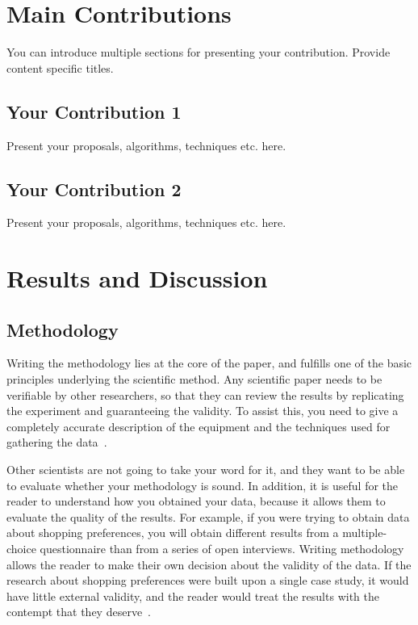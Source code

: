 \documentclass{winslabreport}
\begin{document}
\section{Main Contributions}

You can introduce multiple sections for presenting your contribution. Provide content specific titles.

\subsection{Your Contribution 1}

Present your proposals, algorithms, techniques etc. here.

\subsection{Your Contribution 2}

Present your proposals, algorithms, techniques etc. here.


\section{Results and Discussion}

\subsection{Methodology}
Writing the methodology lies at the core of the paper, and fulfills one of the basic principles underlying the scientific method. Any scientific paper needs to be verifiable by other researchers, so that they can review the results by replicating the experiment and guaranteeing the validity. To assist this, you need to give a completely accurate description of the equipment and the techniques used for gathering the data~\cite{Shuttleworth2016}.

Other scientists are not going to take your word for it, and they want to be able to evaluate whether your methodology is sound. In addition, it is useful for the reader to understand how you obtained your data, because it allows them to evaluate the quality of the results. For example, if you were trying to obtain data about shopping preferences, you will obtain different results from a multiple-choice questionnaire than from a series of open interviews. Writing methodology allows the reader to make their own decision about the validity of the data. If the research about shopping preferences were built upon a single case study, it would have little external validity, and the reader would treat the results with the contempt that they deserve~\cite{Shuttleworth2016}.
\end{document}

